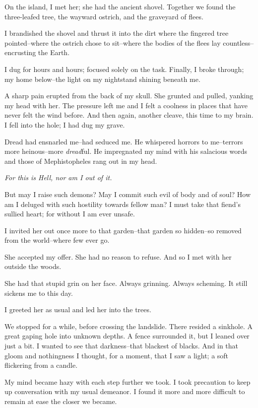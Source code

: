 \documentclass{article}
\begin{document}
On the island, I met her; she had the ancient shovel.
Together we found the three-leafed tree, the
wayward ostrich, and the graveyard of flees.


I brandished the shovel and thrust it into the dirt
where the fingered tree pointed--where the ostrich
chose to sit--where the bodies of the flees lay
countless--encrusting the Earth.


I dug for hours and hours; focused solely on the task.
Finally, I broke through; my home below--the
light on my nightstand shining beneath me.


A sharp pain erupted from the back of my skull.
She grunted and pulled, yanking my head with her.
The pressure left me and I felt a coolness in
places that have never felt the wind before.
And then again, another cleave, this time to my brain.
I fell into the hole; I had dug my grave.
\vvvv


\noindent
Dread had ensnarled me--had seduced me.
He whispered horrors to me--terrors
more heinous--more \textit{dread}ful.
He impregnated my mind with his salacious words and
those of Mephistopheles rang out in my head.
\VV


\textit{For this is Hell, nor am I out of it.}
\VV


\noindent
But may I raise such demons?
May I commit such evil of body and of soul?
How am I deluged with such hostility towards fellow man?
I must take that fiend's sullied heart;
for without I am ever unsafe.
\VV


\noindent
I invited her out once more to that garden--that
garden so hidden--so removed from the world--where
few ever go. %


She accepted my offer.
She had no reason to refuse.
And so I met with her outside the woods.


She had that stupid grin on her face.
Always grinning. Always scheming.
It still sickens me to this day.


I greeted her as usual and led her into the trees.


We stopped for a while, before crossing the landslide.
There resided a sinkhole.
A great gaping hole into unknown depths.
A fence surrounded it,
but I leaned over just a bit.
I wanted to see that darkness--that
blackest of blacks.
And in that gloom and nothingness I thought, for a moment,
that I saw a light; a soft flickering from a candle.


My mind became hazy with each step further we took.
I took precaution to keep up conversation with
my usual demeanor.
I found it more and more difficult to remain at ease the closer we became.
\end{document}

